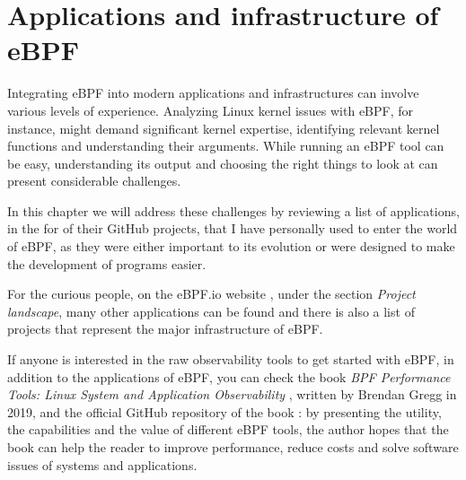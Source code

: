 \chapter{Applications and infrastructure of eBPF}

Integrating eBPF into modern applications and infrastructures can involve various levels of experience. 
Analyzing Linux kernel issues with eBPF, for instance, might demand significant kernel expertise, identifying relevant kernel functions and understanding their arguments.
While running an eBPF tool can be easy, understanding its output and choosing the right things to look at can present considerable challenges.

In this chapter we will address these challenges by reviewing a list of applications, in the for of their GitHub projects, that I have personally used to enter the world of eBPF, as they were either important to its evolution or were designed to make the development of programs easier.

For the curious people, on the eBPF.io website \cite{eBPFioWebsite}, under the section \textit{Project landscape}, many other applications can be found and there is also a list of projects that represent the major infrastructure of eBPF.

If anyone is interested in the raw observability tools to get started with eBPF, in addition to the applications of eBPF, you can check the book \textit{BPF Performance Tools: Linux System and Application Observability} \cite{BPFToolsBookWebsite}, written by Brendan Gregg in 2019, and the official GitHub repository of the book \cite{BPFToolsBookGitHubRepo}: by presenting the utility, the capabilities and the value of different eBPF tools, the author hopes that the book can help the reader to improve performance, reduce costs and solve software issues of systems and applications.


%
%
%
%
%
%
%
%
%
%
%
%
%
%
%
%
